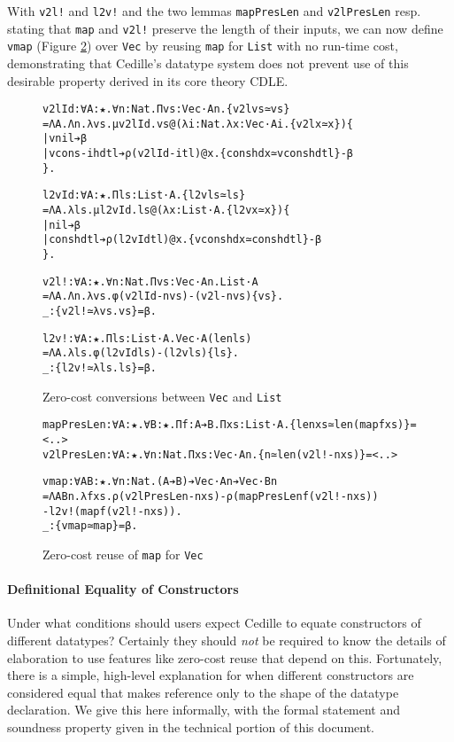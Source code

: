 \documentclass{article}
\begin{document}
With \texttt{v2l!} and \texttt{l2v!} and the two lemmas \texttt{mapPresLen} and
\texttt{v2lPresLen} resp. stating that \texttt{map} and \texttt{v2l!} preserve
the length of their inputs, we can now define \texttt{vmap} (Figure
\ref{fig:cedille-vmap}) over \texttt{Vec} by reusing \texttt{map} for
\texttt{List} with no run-time cost, demonstrating that Cedille's datatype
system does not prevent use of this desirable property derived in its core
theory CDLE.

\begin{figure}[h]
  \small
\begin{alltt}
v2lId: ∀ A: ★. ∀ n: Nat. Π vs: Vec ·A n. \{v2l vs ≃ vs\}
  = Λ A. Λ n. λ vs. μ v2lId. vs @(λ i: Nat. λ x: Vec ·A i. \{v2l x ≃ x\}) \{
  | vnil ➔ β
  | vcons -i hd tl ➔ ρ (v2lId -i tl) @ x. \{cons hd x ≃ vcons hd tl\} - β
  \}.

l2vId: ∀ A: ★. Π ls: List ·A. \{l2v ls ≃ ls\}
  = Λ A. λ ls. μ l2vId. ls @(λ x: List ·A. \{l2v x ≃ x\}) \{
  | nil ➔ β
  | cons hd tl ➔ ρ (l2vId tl) @ x. \{vcons hd x ≃ cons hd tl\} - β
  \}.

v2l!: ∀ A : ★. ∀ n: Nat. Π vs: Vec ·A n. List ·A
  = Λ A. Λ n. λ vs. φ (v2lId -n vs) - (v2l -n vs) \{vs\}.
_ : \{v2l! ≃ λ vs. vs\} = β.

l2v!: ∀ A: ★. Π ls: List ·A. Vec ·A (len ls)
  = Λ A. λ ls. φ (l2vId ls) - (l2v ls) \{ls\}.
_ : \{l2v! ≃ λ ls. ls\} = β.
\end{alltt}
  \caption{Zero-cost conversions between \texttt{Vec} and \texttt{List}}
  \label{fig:cedille-convert-int}
\end{figure}

\begin{figure}[h]
\begin{alltt}
mapPresLen: ∀ A: ★. ∀ B: ★. Π f: A ➔ B. Π xs: List ·A. \{len xs ≃ len (map f xs)\} = <..>
v2lPresLen: ∀ A: ★. ∀ n: Nat. Π xs: Vec ·A n. \{n ≃ len (v2l! -n xs)\} = <..>

vmap: ∀ A B: ★. ∀ n: Nat. (A ➔ B) ➔ Vec ·A n ➔ Vec ·B n
  = Λ A B n. λ f xs. ρ (v2lPresLen -n xs) - ρ (mapPresLen f (v2l! -n xs))
  - l2v! (map f (v2l! -n xs)).
_ : \{vmap ≃ map\} = β.
\end{alltt}
  \caption{Zero-cost reuse of \texttt{map} for \texttt{Vec}}
  \label{fig:cedille-vmap}
\end{figure}

\paragraph{\textbf{Definitional Equality of Constructors}}
Under what conditions should users expect Cedille to equate constructors of
different datatypes? Certainly they should \textit{not} be required to know the
details of elaboration to use features like zero-cost reuse that depend
on this. Fortunately, there is a simple, high-level explanation for when
different constructors are considered equal that makes reference only to the
shape of the datatype declaration. We give this here informally, with
the formal statement and soundness property given in the technical portion of
this document.
\end{document}
